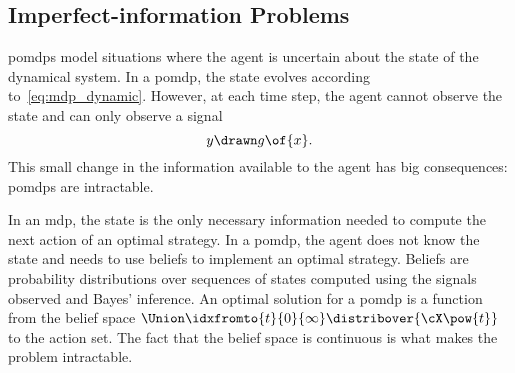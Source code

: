 \subsection{Imperfect-information Problems}
\acp{pomdp} model situations where the agent is uncertain about the state of the dynamical system.
In a \ac{pomdp}, the state evolves according to~\cref{eq:mdp_dynamic}.
However, at each time step, the agent cannot observe the state and can only observe a signal
\begin{equation}
\label{eq:pomdp_observation}
y \drawn g \of {x}.
\end{equation}
This small change in the information available to the agent has big consequences: \acp{pomdp} are intractable.

In an \ac{mdp}, the state is the only necessary information needed to compute the next action of an optimal strategy.
In a \ac{pomdp}, the agent does not know the state and needs to use beliefs to implement an optimal strategy.
Beliefs are probability distributions over sequences of states computed using the signals observed and Bayes' inference.
An optimal solution for a \ac{pomdp} is a function from the belief space \(\Union\idxfromto{t}{0}{\infty}\distribover{\cX\pow{t}}\) to the action set.
The fact that the belief space is continuous is what makes the problem intractable.
